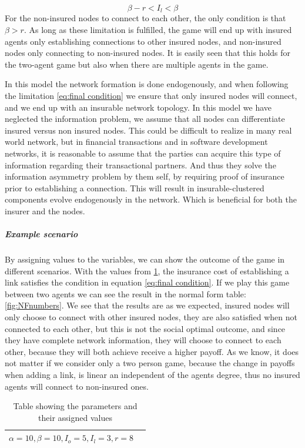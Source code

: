 \begin{equation}
\beta-r<I_{l}<\beta
\label{eq:final condition}
\end{equation}
For the non-insured nodes to connect to each other, the only condition is that $\beta>r$. As long as these limitation is fulfilled, the game will end up with insured agents only establishing connections to other insured nodes, and non-insured nodes only connecting to non-insured nodes. It is easily seen that this holds for the two-agent game but also when there are multiple agents in the game.

In this model the network formation is done endogenously, and when following the limitation \ref{eq:final condition} we ensure that only insured nodes will connect, and we end up with an insurable network topology. 
In this model we have neglected the information problem, we assume that all nodes can differentiate insured versus non insured nodes. This could be difficult to realize in many real world network, but in financial transactions and in software development networks, it is reasonable to assume that the parties can acquire this type of information regarding their transactional partners. And thus they solve the information asymmetry problem by them self, by requiring proof of insurance prior to establishing a connection. This will result in insurable-clustered components  evolve endogenously in the network. Which is beneficial for both the insurer and the nodes.

\subparagraph{Example scenario}
By assigning values to the variables, we can show the outcome of the game in different scenarios. With the values from \ref{tbl:simplegamevalue}, the insurance cost of establishing a link satisfies the condition in equation \ref{eq:final condition}.
If we play this game between two agents we can see the result in the normal form table:\ref{fig:NFnumbers}. 
We see that the results are as we expected, insured nodes will only choose to connect with other insured nodes, they are also satisfied when not connected to each other, but this is not the social optimal outcome, and since they have complete network information, they will choose to connect to each other, because they will both achieve receive a higher payoff.
As we know, it does not matter if we consider only a two person game, because the change in payoffs when adding a link, is linear an independent of the agents degree, thus no insured agents will connect to non-insured ones.
\begin{table}[h]
\centering
\begin{tabular}{lc}
 \hline
  $\alpha=10,
  \beta=10,
  I_{o}=5,
  I_{l}=3,
  r=8$\\
  \hline
\end{tabular}
\caption{Table showing the parameters and their assigned values \label{tbl:simplegamevalue}}
\end{table}

